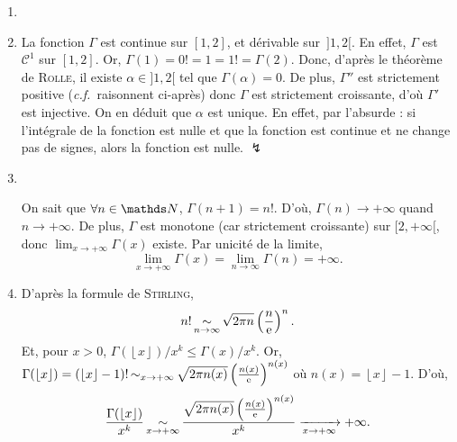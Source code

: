 \begin{exo}
	\begin{enumerate}
		\item
		\item La fonction $\Gamma$\/ est continue sur $[1,2]$, et dérivable sur~$]1,2[$. En effet, $\Gamma$\/ est $\mathcal{C}^1$\/ sur $[1,2]$. Or, $\Gamma(1) = 0! = 1 = 1! = \Gamma(2)$. Donc, d'après le théorème de \textsc{Rolle}, il existe $\alpha \in {]1,2[}$\/ tel que $\Gamma(\alpha) =0$.
			De plus, $\Gamma''$\/ est strictement positive (\textit{c.f.}\ raisonnent ci-après) donc $\Gamma$\/ est strictement croissante, d'où $\Gamma'$\/ est injective. On en déduit que $\alpha$\/ est unique.
		En effet, par l'absurde : si l'intégrale de la fonction est nulle et que la fonction est continue et ne change pas de signes, alors la fonction est nulle. $\lightning$
		\item ~\\
			\begin{center}
			\end{center}
			On sait que $\forall n \in \N$, $\Gamma(n + 1) = n!$. D'où, $\Gamma(n) \longrightarrow +\infty$\/ quand $n \to +\infty$. De plus, $\Gamma$\/ est monotone (car strictement croissante) sur $[2, +\infty[$, donc $\lim_{x\to +\infty} \Gamma(x)$\/ existe. Par unicité de la limite, \[
				\lim_{x\to +\infty} \Gamma(x) = \lim_{n \to \infty} \Gamma(n) = +\infty
			.\]
		\item D'après la formule de \textsc{Stirling}, \[
				n! \operatorname*{\sim}_{n\to\infty} \sqrt{2\pi n} \left( \frac{n}{\mathrm{e}} \right)^n
			.\] Et, pour $x > 0$, $\Gamma(\left\lfloor x \right\rfloor) / x^k \le \Gamma(x) / x^k$. Or, $\Gamma(\left\lfloor x \right\rfloor) = (\left\lfloor x \right\rfloor - 1)! \operatorname*{\sim}_{x \to +\infty} \sqrt{2\pi n(x)} \left( \frac{n(x)}{\mathrm{e}} \right)^{n(x)}$\/ où $n(x) = \left\lfloor x \right\rfloor - 1$.
			D'où,
			\[
				\frac{\Gamma(\left\lfloor x \right\rfloor)}{x^k} \operatorname*{\sim}_{x\to +\infty} \frac{\sqrt{2\pi n(x)} \left( \frac{n(x)}{\mathrm{e}} \right)^{n(x)}}{x^k} \xrightarrow[x\to +\infty]{} +\infty
			.\]
	\end{enumerate}
\end{exo}

